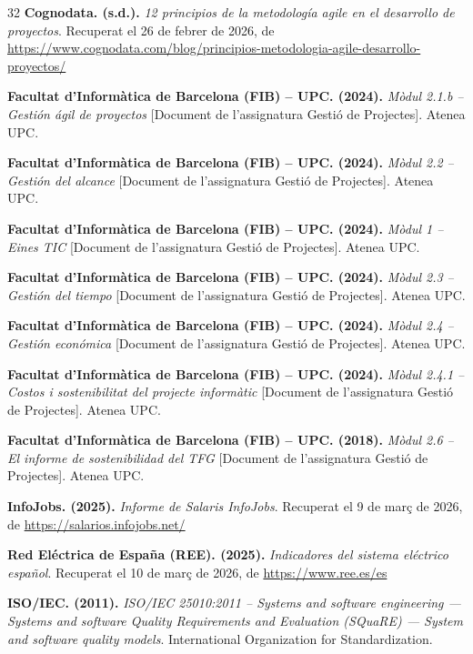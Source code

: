 \documentclass[12pt,a4paper,twoside]{report}
\begin{document}
\begin{thebibliography}{32}
     \textbf{Cognodata. (s.d.).} \textit{12 principios de la metodolog\'ia agile en el desarrollo de proyectos}. Recuperat el 26 de febrer de 2026, de \url{https://www.cognodata.com/blog/principios-metodologia-agile-desarrollo-proyectos/}

     \textbf{Facultat d'Inform\`atica de Barcelona (FIB) -- UPC. (2024).} \textit{M\`odul 2.1.b -- Gesti\'on \'agil de proyectos} [Document de l'assignatura Gesti\'o de Projectes]. Atenea UPC.

     \textbf{Facultat d'Inform\`atica de Barcelona (FIB) -- UPC. (2024).} \textit{M\`odul 2.2 -- Gesti\'on del alcance} [Document de l'assignatura Gesti\'o de Projectes]. Atenea UPC.

     \textbf{Facultat d'Inform\`atica de Barcelona (FIB) -- UPC. (2024).} \textit{M\`odul 1 -- Eines TIC} [Document de l'assignatura Gesti\'o de Projectes]. Atenea UPC.

     \textbf{Facultat d'Inform\`atica de Barcelona (FIB) -- UPC. (2024).} \textit{M\`odul 2.3 -- Gesti\'on del tiempo} [Document de l'assignatura Gesti\'o de Projectes]. Atenea UPC.

     \textbf{Facultat d'Inform\`atica de Barcelona (FIB) -- UPC. (2024).} \textit{M\`odul 2.4 -- Gesti\'on econ\'omica} [Document de l'assignatura Gesti\'o de Projectes]. Atenea UPC.

     \textbf{Facultat d'Inform\`atica de Barcelona (FIB) -- UPC. (2024).} \textit{M\`odul 2.4.1 -- Costos i sostenibilitat del projecte inform\`atic} [Document de l'assignatura Gesti\'o de Projectes]. Atenea UPC.

     \textbf{Facultat d'Inform\`atica de Barcelona (FIB) -- UPC. (2018).} \textit{M\`odul 2.6 -- El informe de sostenibilidad del TFG} [Document de l'assignatura Gesti\'o de Projectes]. Atenea UPC.

     \textbf{InfoJobs. (2025).} \textit{Informe de Salaris InfoJobs}. Recuperat el 9 de mar\c{c} de 2026, de \url{https://salarios.infojobs.net/}

     \textbf{Red El\'ectrica de Espa\~na (REE). (2025).} \textit{Indicadores del sistema el\'ectrico espa\~nol}. Recuperat el 10 de mar\c{c} de 2026, de \url{https://www.ree.es/es}

     \textbf{ISO/IEC. (2011).} \textit{ISO/IEC 25010:2011 -- Systems and software engineering --- Systems and software Quality Requirements and Evaluation (SQuaRE) --- System and software quality models}. International Organization for Standardization.


\end{thebibliography}
\end{document}
